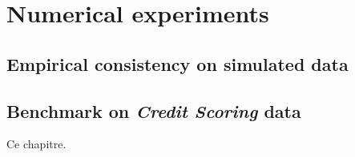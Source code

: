 \section{Numerical experiments}


\subsection{Empirical consistency on simulated data}

\subsection{Benchmark on \textit{Credit Scoring} data}




\bigskip

Ce chapitre.


\printbibliography[heading=subbibliography, title=References of Chapter 5]

